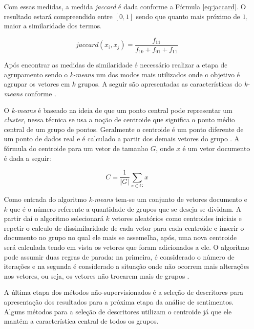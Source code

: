 Com essas medidas, a medida \textit{jaccard} é dada conforme a Fórmula \ref{eq:jaccard}. O resultado estará compreendido entre $\left [ 0,1 \right ]$ sendo que quanto mais próximo de $1$, maior a similaridade dos termos.

\begin{equation}
    \label{eq:jaccard}
     jaccard(x_{i},x_{j}) = \frac{f_{11} }{f_{10} +f_{01}  + f_{11} }
\end{equation}

Após encontrar as medidas de similaridade é necessário  realizar a etapa de agrupamento sendo o \textit{k-means} um dos modos mais utilizados onde o objetivo é agrupar os vetores em $k$ grupos. A seguir são apresentadas as características do \textit{k-means} conforme  .

O \textit{k-means} é baseado na ideia de que um ponto central pode representar um \textit{cluster}, nessa técnica se usa a noção de centroide que significa o ponto médio central de um grupo de pontos. Geralmente o centroide é um ponto diferente de um ponto de dados real e é calculado a partir dos demais vetores do grupo \cite{Steinbach00acomparison}. A fórmula do centroide para um vetor de tamanho $G$, onde $x$ é um vetor documento é dada a seguir:

\begin{equation}
    \label{eq:centroide}
     C=\frac{1}{|G|}\sum_{x \in G}x
\end{equation}

Como entrada do algoritmo \textit{k-means} tem-se um conjunto de vetores documento e $k$ que é o número referente a quantidade de grupos que se deseja se dividam. A partir daí o algoritmo selecionará $k$ vetores aleatórios como centroides iniciais e repetir o calculo de dissimilaridade de cada vetor para cada centroide e inserir o documento no grupo no qual ele mais se assemelha, após, uma nova centroide será calculada tendo em vista os vetores que foram adicionados a ele. O algoritmo pode assumir duas regras de parada: na primeira, é considerado o número de iterações e na segunda é considerado a situação onde não ocorrem mais alterações nos vetores, ou seja, os vetores não trocarem mais de grupos \cite{Steinbach00acomparison}.

A última etapa dos métodos não-supervisionados é a seleção de descritores para apresentação dos resultados para a próxima etapa da análise de sentimentos. Alguns métodos para a seleção de descritores utilizam o centroide já que ele mantém a característica central de todos os grupos.

